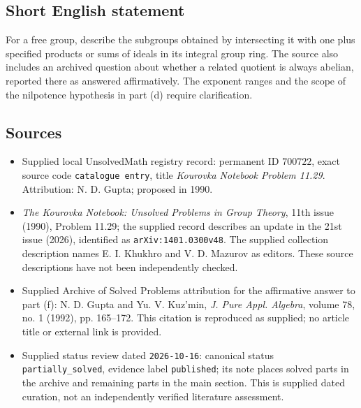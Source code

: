 \documentclass[11pt]{article}
\begin{document}
\subsection{Short English statement}
For a free group, describe the subgroups obtained by intersecting it with one plus specified products or sums of ideals in its integral group ring. The source also includes an archived question about whether a related quotient is always abelian, reported there as answered affirmatively. The exponent ranges and the scope of the nilpotence hypothesis in part (d) require clarification.
\subsection{Sources}
\begin{itemize}
\item Supplied local UnsolvedMath registry record: permanent ID \(700722\), exact source code \texttt{catalogue entry}, title \emph{Kourovka Notebook Problem 11.29}. Attribution: N. D. Gupta; proposed in 1990.
\item \emph{The Kourovka Notebook: Unsolved Problems in Group Theory}, 11th issue (1990), Problem 11.29; the supplied record describes an update in the 21st issue (2026), identified as \texttt{arXiv:1401.0300v48}. The supplied collection description names E. I. Khukhro and V. D. Mazurov as editors. These source descriptions have not been independently checked.
\item Supplied Archive of Solved Problems attribution for the affirmative answer to part (f): N. D. Gupta and Yu. V. Kuz'min, \emph{J. Pure Appl. Algebra}, volume 78, no. 1 (1992), pp. 165--172. This citation is reproduced as supplied; no article title or external link is provided.
\item Supplied status review dated \texttt{2026-10-16}: canonical status \texttt{partially\_solved}, evidence label \texttt{published}; its note places solved parts in the archive and remaining parts in the main section. This is supplied dated curation, not an independently verified literature assessment.
\end{itemize}
\end{document}
